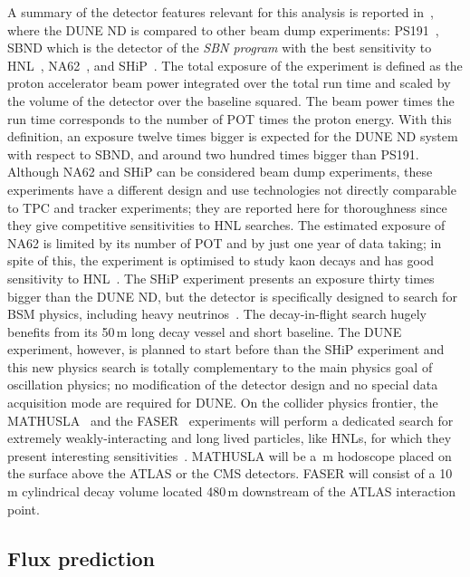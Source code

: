 A summary of the detector features relevant for this analysis is reported in~, %
where the DUNE ND is compared to other beam dump experiments: %
PS191~\cite{Bernardi:1985ny,Bernardi:1987ek}, SBND which is the detector of the \emph{SBN program} with the best sensitivity to %
HNL~\cite{Ballett:2016opr}, NA62~\cite{NA62:2017rwk}, and SHiP~\cite{Anelli:2015pba}.
The total exposure of the experiment is defined as the proton accelerator beam power integrated over the total run time %
and scaled by the volume of the detector over the baseline squared.
The beam power times the run time corresponds to the number of POT times the proton energy. 
With this definition, an exposure twelve times bigger is expected for the DUNE ND system with respect to SBND, %
and around two hundred times bigger than PS191.
Although NA62 and SHiP can be considered beam dump experiments, these experiments have a different design %
and use technologies not directly comparable to TPC and tracker experiments; %
they are reported here for thoroughness since they give competitive sensitivities to HNL searches.
The estimated exposure of NA62 is limited by its number of POT and by just one year of data taking; %
in spite of this, the experiment is optimised to study kaon decays and has good %
sensitivity to HNL~\cite{Drewes:2018irr}.
The SHiP experiment presents an exposure thirty times bigger than the DUNE ND, but the detector is specifically %
designed to search for BSM physics, including heavy neutrinos~\cite{SHiP:2018xqw,Caputo:2016ojx}.
The decay-in-flight search hugely benefits from its 50\,m long decay vessel and short baseline.
The DUNE experiment, however, is planned to start before than the SHiP experiment and %
this new physics search is totally complementary to the main physics goal of oscillation physics; %
no modification of the detector design and no special data acquisition mode are required for DUNE.
On the collider physics frontier, the MATHUSLA~\cite{Curtin:2018mvb} and the FASER~\cite{Ariga:2018uku} experiments %
will perform a dedicated search for extremely weakly-interacting and long lived particles, %
like HNLs, for which they present interesting sensitivities~\cite{Curtin:2018mvb, Kling:2018wct}.
MATHUSLA will be a \,m hodoscope placed on the surface above the ATLAS or the CMS detectors.
FASER will consist of a 10\,m cylindrical decay volume located 480\,m downstream of the ATLAS interaction point. 

\subsection{Flux prediction}
\label{sec:tauneutrino}

